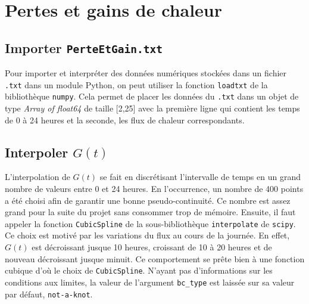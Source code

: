 \documentclass[12pt]{article}
\begin{document}
\section{Pertes et gains de chaleur}
    \subsection{Importer \texttt{PerteEtGain.txt}}
        Pour importer et interpréter des données numériques stockées dans un fichier \texttt{.txt} dans un module Python, on peut utiliser la fonction \texttt{loadtxt} de la bibliothèque \texttt{numpy}. Cela permet de placer les données du \texttt{.txt} dans un objet de type \textit{Array of float64} de taille [2,25] avec la première ligne qui contient les temps de 0 à 24 heures et la seconde, les flux de chaleur correspondants.
        
    \subsection{Interpoler $G(t)$}
        L'interpolation de $G(t)$ se fait en discrétisant l'intervalle de temps en un grand nombre de valeurs entre 0 et 24 heures. En l'occurrence, un nombre de 400 points a été choisi afin de garantir une bonne pseudo-continuité. Ce nombre est assez grand pour la suite du projet sans consommer trop de mémoire. Ensuite, il faut appeler la fonction \texttt{CubicSpline} de la sous-bibliothèque \texttt{interpolate} de \texttt{scipy}. Ce choix est motivé par les variations du flux au cours de la journée. En effet, $G(t)$ est décroissant jusque 10 heures, croissant de 10 à 20 heures et de nouveau décroissant jusque minuit. Ce comportement se prête bien à une fonction cubique d'où le choix de \texttt{CubicSpline}. N'ayant pas d'informations sur les conditions aux limites, la valeur de l'argument \texttt{bc\_type} est laissée sur sa valeur par défaut, \texttt{not-a-knot}.
        
\end{document}
